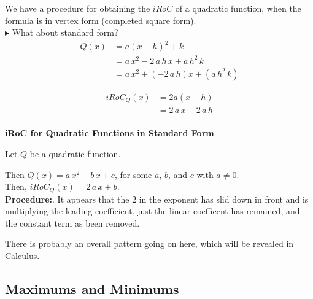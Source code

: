 \documentclass{ximera}
\begin{document}
We have a procedure for obtaining the $iRoC$ of a quadratic function, when the formula is in vertex form (completed square form). \\

\textbf{\textcolor{blue!55!black}{$\blacktriangleright$}} What about standard form? \\



\begin{align*}
Q(x) & = a (x - h)^2 + k \\
     & = a \, x^2 - 2 \, a \, h \, x + a \, h^2 \, k \\
     & = a \, x^2  + (- 2 \, a \, h) x + (a \, h^2 \, k) 
\end{align*}


\begin{align*}
iRoC_Q(x) &= 2 a (x - h) \\
          & = 2 \, a \, x - 2 \, a \, h  \\
\end{align*}





\begin{procedure} \textbf{\textcolor{blue!75!black}{iRoC for Quadratic Functions in Standard Form}} 



Let $Q$ be a quadratic function.

Then $Q(x) = a \, x^2 + b \, x + c$, for some $a$, $b$, and $c$ with $a \ne 0$. \\

Then, $iRoC_Q(x) = 2 \, a \, x + b$. \\


\textbf{Procedure:}. It appears that the $2$ in the exponent has slid down in front and is multiplying the leading coefficient, just the linear coefficent has remained, and the constant term as been removed. 



\end{procedure}

There is probably an overall pattern going on here, which will be revealed in Calculus. \\












\subsection*{Maximums and Minimums}
\end{document}
